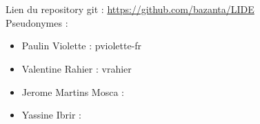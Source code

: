 \chapter{}

Lien du repository git :  \url{https://github.com/bazanta/LIDE}
\\Pseudonymes :
\begin{itemize}

	\item Paulin Violette : pviolette-fr
	\item Valentine Rahier : vrahier
	\item Jerome Martins Mosca :
	\item Yassine Ibrir :

\end{itemize}
